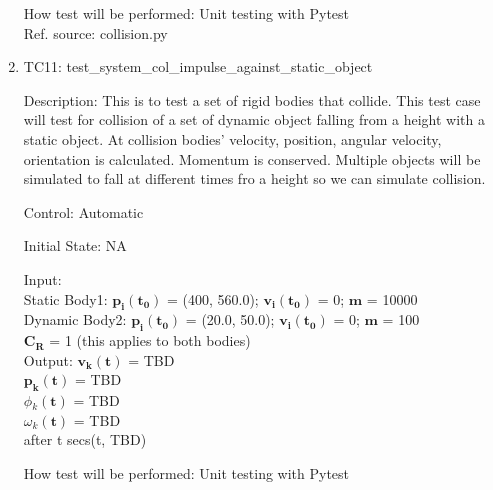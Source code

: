 \documentclass[12pt, titlepage]{article}
\begin{document}
\begin{enumerate}
	How test will be performed: Unit testing with Pytest\\
	Ref. source: collision.py
	
	\item{TC11: test\_system\_col\_impulse\_against\_static\_object\\}

Description: This is to test a set of rigid bodies that collide. This test case will test for collision of a set of dynamic object falling from a height with a static object. At collision bodies' velocity, position, angular velocity, orientation is calculated. Momentum is conserved. Multiple objects will be simulated to fall at different times fro a height so we can simulate collision.

Control: Automatic

Initial State: NA

Input:\\
Static Body1: $\mathbf{p_i}$$\mathbf{(t_0)}$ = (400, 560.0); $\mathbf{v_i}$$\mathbf{(t_0)}$ = 0; $\mathbf{m}$ = 10000 \\ 
Dynamic Body2: $\mathbf{p_i}$$\mathbf{(t_0)}$ = (20.0, 50.0); $\mathbf{v_i}$$\mathbf{(t_0)}$ = 0; $\mathbf{m}$ = 100 \\ 
$\mathbf{C_R}$$\mathbf{}$ = 1 (this applies to both bodies) \\


Output:  $\mathbf{v_k}$$\mathbf{(t)}$ = TBD \\
\hspace*{1.3cm}$\mathbf{p_k}$$\mathbf{(t)}$ = TBD\\
\hspace*{1.3cm}$\phi$$_k\mathbf{(t)}$ = TBD\\
\hspace*{1.3cm}$\omega$$_k\mathbf{(t)}$$ \mathbf{}$ = TBD\\
after t secs(t, TBD) 

How test will be performed: Unit testing with Pytest

\end{enumerate}	
	
\end{document}
